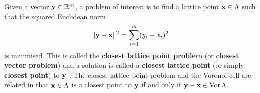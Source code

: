 

Given a vector $\mathbf{y} \in {\mathbb R}^m$, a problem of interest is to find a lattice point $\mathbf{x} \in \Lambda$ such that the squared Euclidean norm
\[
\| \mathbf{y} - \mathbf{x} \|^2 = \sum_{i=1}^m (y_i - x_i)^2 
\]  
is minimised.  This is called the \textbf{closest lattice point problem} (or \textbf{closest vector problem}) and a solution is called a \textbf{closest lattice point} (or simply \textbf{closest point}) to $\mathbf{y}$ \cite{Agrell2002,McKilliam2009CoxeterLattices,MicciancioVoulgaris_deterministic_jv_2013,McKilliam_closest_point_lattice_first_kind_2014}.  The closest lattice point problem and the Voronoi cell are related in that $\mathbf{x}\in\Lambda$ is a closest point to $\mathbf{y}$ if and only if $\mathbf{y} - \mathbf{x} \in \operatorname{Vor}\Lambda$.  

